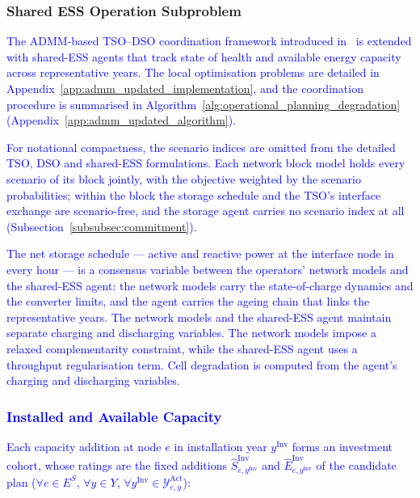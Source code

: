 \documentclass[preprint,12pt]{elsarticle}
\begin{document}
\subsubsection{Shared ESS Operation Subproblem}

\textcolor{blue}{
    The ADMM-based TSO--DSO coordination framework introduced in~\cite{simoes_2023} is extended with shared-ESS agents that track state of health and available energy capacity across representative years. The local optimisation problems are detailed in Appendix~\ref{app:admm_updated_implementation}, and the coordination procedure is summarised in Algorithm~\ref{alg:operational_planning_degradation} (Appendix~\ref{app:admm_updated_algorithm}).
}

\textcolor{blue}{
    For notational compactness, the scenario indices are omitted from the detailed TSO, DSO and shared-ESS formulations. Each network block model holds every scenario of its block jointly, with the objective weighted by the scenario probabilities; within the block the storage schedule and the TSO's interface exchange are scenario-free, and the storage agent carries no scenario index at all (Subsection~\ref{subsubsec:commitment}).
}

\textcolor{blue}{
    The net storage schedule --- active and reactive power at the interface node in every hour --- is a consensus variable between the operators' network models and the shared-ESS agent: the network models carry the state-of-charge dynamics and the converter limits, and the agent carries the ageing chain that links the representative years. 
    The network models and the shared-ESS agent maintain separate charging and discharging variables. The network models impose a relaxed complementarity constraint, while the shared-ESS agent uses a throughput regularisation term. Cell degradation is computed from the agent's charging and discharging variables.
}

\subsubsection{\textcolor{blue}{Installed and Available Capacity}}

\textcolor{blue}{
    Each capacity addition at node $e$ in installation year $y^{\text{Inv}}$ forms an investment cohort, whose ratings are the fixed additions $\hat{S}^{\text{Inv}}_{e,y^{\text{Inv}}}$ and $\hat{E}^{\text{Inv}}_{e,y^{\text{Inv}}}$ of the candidate plan ($\forall e\in E^S$, $\forall y\in Y$, $\forall y^{\text{Inv}}\in\mathcal{Y}^{\text{Act}}_{e,y}$):
}
\end{document}
